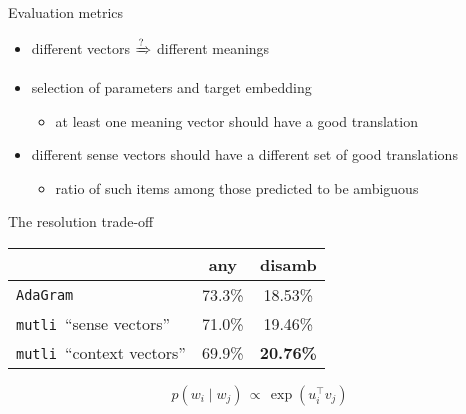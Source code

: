 \documentclass[10pt]{beamer}%
\newcommand{\bull}[1]{\begin{itemize}\item #1 \end{itemize}}
\newcommand{\adagram}{\texttt{AdaGram}}
\newcommand{\mutli}{\texttt{mutli}}
\begin{document}
\begin{frame}{Evaluation metrics}
  \begin{itemize}
    \item different vectors $ \xRightarrow ? $ different meanings
    \item selection of parameters and target embedding
      \bull{at least one meaning vector should have a good translation}
    \item different sense vectors should have a different set of good
      translations
        \bull{ratio of such items among those predicted to be ambiguous}
  \end{itemize}
  \end{frame}
    \begin{frame}{The resolution trade-off}
      \begin{table}[allowframebreaks]
        \begin{tabular}{lcc}
          \toprule
                                    & any     & disamb \\
          \midrule
          \adagram                  & 73.3\%  & 18.53\% \\
          \mutli~``sense vectors''  & 71.0\%  & 19.46\% \\
          \mutli~``context vectors''& 69.9\%  & {\bf 20.76\%} \\
          \bottomrule
    \end{tabular}
  \end{table}
      \[p(w_i\mid w_j) \, \propto \, \exp (u_i ^\top v_j)\]
\end{frame}
\end{document}
